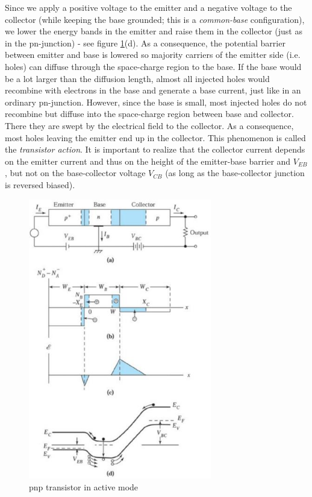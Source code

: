 Since we apply a positive voltage to the emitter and a negative voltage to the collector (while keeping the base grounded; this is a \emph{common-base} configuration), we lower the energy bands in the emitter and raise them in the collector (just as in the pn-junction) - see figure \ref{fig:bjt3}(d). As a consequence, the potential barrier between emitter and base is lowered so majority carriers of the emitter side (i.e. holes) can diffuse through the space-charge region to the base. If the base would be a lot larger than the diffusion length, almost all injected holes would recombine with electrons in the base and generate a base current, just like in an ordinary pn-junction. However, since the base is small, most injected holes do not recombine but diffuse into the space-charge region between base and collector. There they are swept by the electrical field to the collector. As a consequence, most holes leaving the emitter end up in the collector. This phenomenon is called the \emph{transistor action}. It is important to realize that the collector current depends on the emitter current and thus on the height of the emitter-base barrier and $V_{EB}$, but not on the base-collector voltage $V_{CB}$ (as long as the base-collector junction is reversed biased).

\begin{figure}[h!]
\centering
\includegraphics[width=8cm]{figures/ch01/bjt3.jpg}
\caption{pnp transistor in active mode} 
\label{fig:bjt3}
\end{figure}

